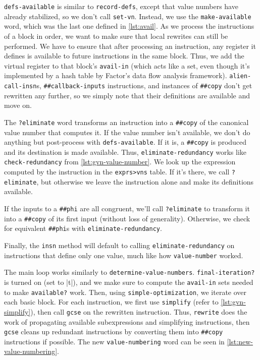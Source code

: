 \Verb|defs-available| is similar to \Verb|record-defs|, except that value
numbers have already stabilized, so we don't call \Verb|set-vn|.  Instead, we
use the \Verb|make-available| word, which was the last one defined in
\cref{lst:avail}.  As we process the instructions of a block in order, we want
to make sure that local rewrites can still be performed.  We have to ensure
that after processing an instruction, any register it defines is available to
future instructions in the same block.  Thus, we add the virtual register to
that block's \Verb|avail-in| (which acts like a set, even though it's
implemented by a hash table by Factor's data flow analysis framework).
\Verb|alien-call-insn|s, \Verb|##callback-inputs| instructions, and
instances of \Verb|##copy| don't get rewritten any further, so we simply note
that their definitions are available and move on.

The \Verb|?eliminate| word transforms an instruction into a \Verb|##copy|
of the canonical value number that computes it.  If the value number isn't
available, we don't do anything but post-process with \Verb|defs-available|.
If it is, a \Verb|##copy| is produced and its destination is made available.
Thus, \Verb|eliminate-redundancy| works like \Verb|check-redundancy| from
\cref{lst:gvn-value-number}.  We look up the expression computed by the
instruction in the \Verb|exprs>vns| table.  If it's there, we call
\Verb|?eliminate|, but otherwise we leave the instruction alone and make its
definitions available.

If the inputs to a \Verb|##phi| are all congruent, we'll call
\Verb|?eliminate| to transform it into a \Verb|##copy| of its first input
(without loss of generality).  Otherwise, we check for equivalent
\Verb|##phi|s with \Verb|eliminate-redundancy|.

Finally, the \Verb|insn| method will default to calling
\Verb|eliminate-redundancy| on instructions that define only one value, much
like how \Verb|value-number| worked.


The main loop works similarly to \Verb|determine-value-numbers|.
\Verb|final-iteration?| is turned on (set to \factor|t|), and we make sure to
compute the \Verb|avail-in| sets needed to make \Verb|available?| work.
Then, using \Verb|simple-optimization|, we iterate over each basic block.
For each instruction, we first use \Verb|simplify| (refer to
\cref{lst:gvn-simplify}), then call \Verb|gcse| on the rewritten instruction.
Thus, \Verb|rewrite| does the work of propagating available subexpressions
and simplifying instructions, then \Verb|gcse| cleans up redundant
instructions by converting them into \Verb|##copy| instructions if possible.
The new \Verb|value-numbering| word can be seen in
\cref{lst:new-value-numbering}.

